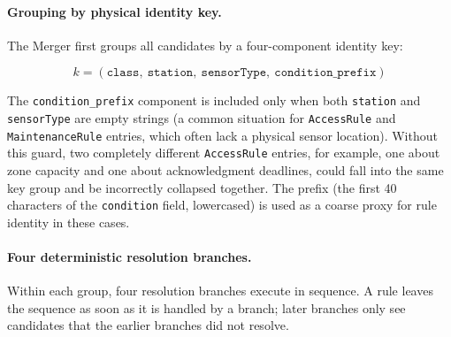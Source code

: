 ﻿\documentclass[11pt]{article}
\begin{document}
\paragraph{Grouping by physical identity key.}
The Merger first groups all candidates by a four-component identity key:

\[
  k = (\texttt{class},\ \texttt{station},\ \texttt{sensorType},\ \texttt{condition\_prefix})
\]

The \texttt{condition\_prefix} component is included only when both
\texttt{station} and \texttt{sensorType} are empty strings (a common situation
for \texttt{AccessRule} and \texttt{MaintenanceRule} entries, which often lack a
physical sensor location).  Without this guard, two completely different
\texttt{AccessRule} entries, for example, one about zone capacity and one about
acknowledgment deadlines, could fall into the same key group and be incorrectly
collapsed together.  The prefix (the first 40 characters of the
\texttt{condition} field, lowercased) is used as a coarse proxy for rule identity
in these cases.

\paragraph{Four deterministic resolution branches.}
Within each group, four resolution branches execute in sequence.  A rule leaves
the sequence as soon as it is handled by a branch; later branches only see
candidates that the earlier branches did not resolve.
\end{document}

